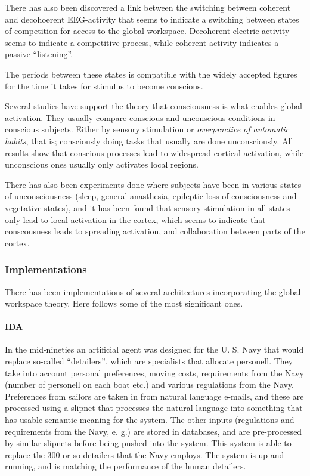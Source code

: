 There has also been discovered a link between the switching between coherent and decohoerent EEG-activity that seems to indicate a switching between states of competition for access to the global workspace. Decoherent electric activity seems to indicate a competitive process, while coherent activity indicates a passive ``listening''.\cite{freeman2003neurobiological}

The periods between these states is compatible with the widely accepted figures for the time it takes for stimulus to become conscious.\cite{shanahan2005applying}

Several studies have support the theory that consciousness is what enables global activation. They usually compare conscious and unconscious conditions in conscious subjects. Either by sensory stimulation or {\em overpractice of automatic habits}, that is; consciously doing tasks that usually are done unconsciously. All results show that conscious processes lead to widespread cortical activation, while unconscious ones usually only activates local regions.\cite{baars2003brain}

There has also been experiments done where subjects have been in various states of unconsciousness (sleep, general anasthesia, epileptic loss of consciousness and vegetative states), and it has been found that sensory stimulation in all states only lead to local activation in the cortex, which seems to indicate that conscousness leads to spreading activation, and collaboration between parts of the cortex.\cite{shanahan2005applying}

\subsubsection{Implementations}
There has been implementations of several architectures incorporating the global workspace theory. Here follows some of the most significant ones.

\paragraph{IDA}
In the mid-nineties an artificial agent was designed for the U. S. Navy that would replace so-called ``detailers'', which are specialists that allocate personell. They take into account personal preferences, moving costs, requirements from the Navy (number of personell on each boat etc.) and various regulations from the Navy. Preferences from sailors are taken in from natural language e-mails, and these are processed using a slipnet that processes the natural language into something that has usable semantic meaning for the system. The other inputs (regulations and requirements from the Navy, e. g.) are stored in databases, and are pre-processed by similar slipnets before being pushed into the system. This system is able to replace the 300 or so detailers that the Navy employs. The system is up and running, and is matching the performance of the human detailers. \cite{baars2007architectural}\cite{franklin1998ida}

